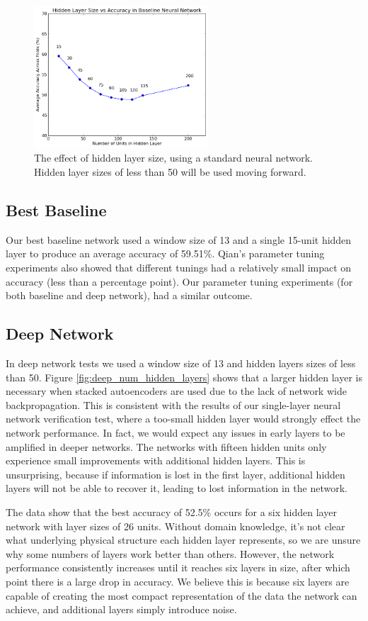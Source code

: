 \documentclass[letterpaper,twocolumn,12pt]{article}
\begin{document}
\begin{figure}[ht!]
\centering
\includegraphics[width=65mm]{results/baseline/baseline_hiddenLayerSize.png}
\caption{The effect of hidden layer size, using a standard neural network.  Hidden layer sizes of less than 50 will be used moving forward.}
\label{fig:baseline_hidden_layer_size}
\end{figure}

\subsection{Best Baseline}
\label{subsec:bestbaseline}
Our best baseline network used a window size of 13 and a single 15-unit hidden layer to produce an average accuracy of 59.51\%.
Qian's parameter tuning experiments also showed that different tunings had a relatively small impact on accuracy (less than a percentage point).
Our parameter tuning experiments (for both baseline and deep network), had a similar outcome.

\subsection{Deep Network}
In deep network tests we used a window size of 13 and hidden layers sizes of less than 50.
Figure \ref{fig:deep_num_hidden_layers} shows that a larger hidden layer is necessary when stacked autoencoders are used due to the lack of network wide backpropagation.
This is consistent with the results of our single-layer neural network verification test, where a too-small hidden layer would strongly effect the network performance.
In fact, we would expect any issues in early layers to be amplified in deeper networks.
The networks with fifteen hidden units only experience small improvements with additional hidden layers.
This is unsurprising, because if information is lost in the first layer, additional hidden layers will not be able to recover it, leading to lost information in the network.

The data show that the best accuracy of 52.5\% occurs for a six hidden layer network with layer sizes of 26 units.
Without domain knowledge, it's not clear what underlying physical structure each hidden layer represents, so we are unsure why some numbers of layers work better than others.
However, the network performance consistently increases until it reaches six layers in size, after which point there is a large drop in accuracy.
We believe this is because six layers are capable of creating the most compact representation of the data the network can achieve, and additional layers simply introduce noise.
\end{document}
